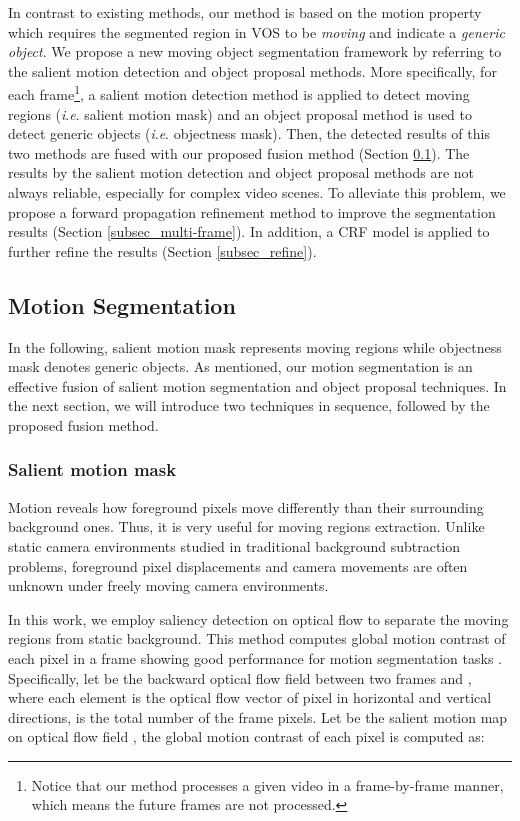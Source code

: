 \documentclass[journal]{IEEEtran}
\newcommand{\ie}{\textit{i}.\textit{e}. }
\begin{document}
In contrast to existing methods, our method is based on the motion property which requires the segmented region in VOS to be \emph{moving} and indicate a \emph{generic object}. We propose a new moving object segmentation framework by referring to the salient motion detection and object proposal methods. More specifically, for each frame\footnote{Notice that our method processes a given video in a frame-by-frame manner, which means the future frames are not processed.}, a salient motion detection method is applied to detect moving regions (\ie salient motion mask) and an object proposal method is used to detect generic objects (\ie objectness mask). Then, the detected results of this two methods are fused with our proposed fusion method (Section \ref{subsec_inter-frame}). The results by the salient motion detection and object proposal methods are not always reliable, especially for complex video scenes. To alleviate this problem, we propose a forward propagation refinement method to improve the segmentation results (Section \ref{subsec_multi-frame}). In addition, a CRF model is applied to further refine the results (Section \ref{subsec_refine}).

\subsection{Motion Segmentation}
\label{subsec_inter-frame}
In the following, salient motion mask represents moving regions while objectness mask denotes generic objects.
As mentioned, our motion segmentation is an effective fusion of salient motion segmentation and object proposal techniques. 
In the next section, we will introduce two techniques in sequence, followed by the proposed fusion method.

\subsubsection{Salient motion mask}
Motion reveals how foreground pixels move differently than their surrounding background ones. 
Thus, it is very useful for moving regions extraction. 
Unlike static camera environments studied in traditional background subtraction problems, 
foreground pixel displacements and camera movements are often unknown under freely moving camera environments. 

In this work, we employ saliency detection \cite{ICCV2015_Zhang} on optical flow to separate the moving regions from static background. 
This method computes global motion contrast of each pixel in a frame showing good performance for motion segmentation tasks \cite{CVPR2016_Perazzi,TIP2013_Li}.
Specifically, let {\small } be the backward optical flow field between two frames {\small } and {\small }, 
where each element {\small } is the optical flow vector of pixel {\small } in horizontal and vertical directions, 
 is the total number of the frame pixels.
Let {\small } be the salient motion map on optical flow field {\small },
the global motion contrast {\small } of each pixel {\small } is computed as:
\end{document}
